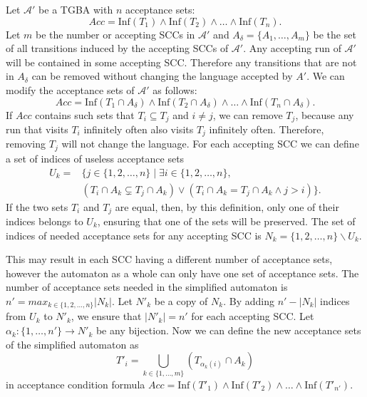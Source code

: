 \documentclass[
  digital, %
  twoside, %
  table,   %
  lof,     %
  lot,     %
]{fithesis3}
\begin{document}
Let $\mathcal{A'}$ be a TGBA with $n$ acceptance sets: 
\begin{equation*}
  Acc = \text{Inf}(T_1) \wedge \text{Inf}(T_2) \wedge \dots \wedge \text{Inf}(T_n).
\end{equation*}
Let $m$ be the number or accepting SCCs in $\mathcal{A'}$ and $A_\delta = \{A_1, \dots, A_m\}$ be the set of all transitions induced by the accepting SCCs of $\mathcal{A'}$. 
Any accepting run of $\mathcal{A'}$ will be contained in some accepting SCC. Therefore any transitions that are not in $A_\delta$ can be removed without changing the language accepted by $A'$. We can modify the acceptance sets of $\mathcal{A'}$ as follows: 
\begin{equation*}
  Acc = \text{Inf}(T_1 \cap A_\delta) \wedge \text{Inf}(T_2 \cap A_\delta) \wedge \dots \wedge \text{Inf}(T_n \cap A_\delta).
\end{equation*}
If $Acc$ contains such sets that $T_i \subseteq T_j$ and $i \neq j$, we can remove $T_j$, because any run that visits $T_i$ infinitely often also visits $T_j$ infinitely often. Therefore, removing $T_j$ will not change the language.
For each accepting SCC we can define a set of indices of useless acceptance sets 
\begin{equation*}
  \begin{aligned}
    U_k = &\{ j \in \{1, 2, \dots, n\} \mid \exists i \in \{1, 2, \dots, n\}, \\
    &(T_i \cap A_k \subsetneq T_j \cap A_k) \vee (T_i \cap A_k = T_j \cap A_k \wedge j > i)\}.
  \end{aligned}
\end{equation*}
If the two sets $T_i$ and $T_j$ are equal, then, by this definition, only one of their indices belongs to $U_k$, ensuring that one of the sets will be preserved. The set of indices of needed acceptance sets for any accepting SCC is $N_k = \{1, 2, \dots, n\} \smallsetminus U_k$. 

This may result in each SCC having a different number of acceptance sets, however the automaton as a whole can only have one set of acceptance sets. The number of acceptance sets needed in the simplified automaton is $n' = max_{k \in \{1, 2, \dots, n\}} |N_k|$. Let $N'_k$ be a copy of $N_k$. By adding $n' - |N_k|$ indices from $U_k$ to $N'_k$, we ensure that $|N'_k| = n'$ for each accepting SCC. Let $\alpha_k \colon \{1, \dots, n'\} \to N'_k$ be any bijection. Now we can define the new acceptance sets of the simplified automaton as
\begin{equation*}
  T'_i = \underset{k \in \{1, \dots, m\}}\bigcup (T_{\alpha_k(i)} \cap A_k)
\end{equation*}
in acceptance condition formula $Acc = \text{Inf}(T'_1) \wedge \text{Inf}(T'_2) \wedge \dots \wedge \text{Inf}(T'_{n'})$.
\end{document}
